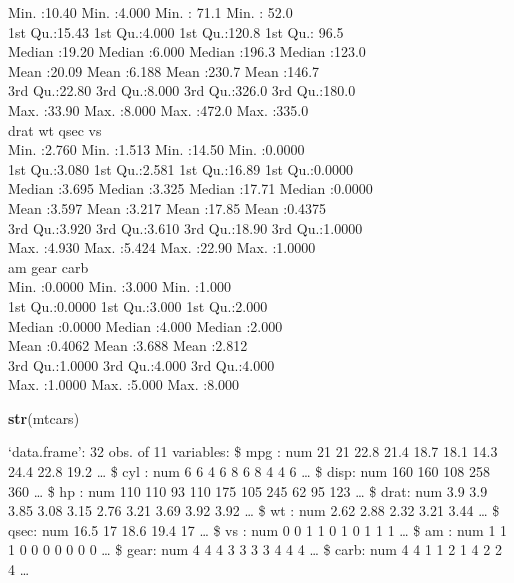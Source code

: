 \documentclass[12pt,]{04-class-files/abntex2}
\newenvironment{Shaded}{\begin{snugshade}}{\end{snugshade}}
\newcommand{\KeywordTok}[1]{\textcolor[rgb]{0.13,0.29,0.53}{\textbf{#1}}}
\newcommand{\NormalTok}[1]{#1}
\begin{document}
Min. :10.40 Min. :4.000 Min. : 71.1 Min. : 52.0\\
1st Qu.:15.43 1st Qu.:4.000 1st Qu.:120.8 1st Qu.: 96.5\\
Median :19.20 Median :6.000 Median :196.3 Median :123.0\\
Mean :20.09 Mean :6.188 Mean :230.7 Mean :146.7\\
3rd Qu.:22.80 3rd Qu.:8.000 3rd Qu.:326.0 3rd Qu.:180.0\\
Max. :33.90 Max. :8.000 Max. :472.0 Max. :335.0\\
drat wt qsec vs\\
Min. :2.760 Min. :1.513 Min. :14.50 Min. :0.0000\\
1st Qu.:3.080 1st Qu.:2.581 1st Qu.:16.89 1st Qu.:0.0000\\
Median :3.695 Median :3.325 Median :17.71 Median :0.0000\\
Mean :3.597 Mean :3.217 Mean :17.85 Mean :0.4375\\
3rd Qu.:3.920 3rd Qu.:3.610 3rd Qu.:18.90 3rd Qu.:1.0000\\
Max. :4.930 Max. :5.424 Max. :22.90 Max. :1.0000\\
am gear carb\\
Min. :0.0000 Min. :3.000 Min. :1.000\\
1st Qu.:0.0000 1st Qu.:3.000 1st Qu.:2.000\\
Median :0.0000 Median :4.000 Median :2.000\\
Mean :0.4062 Mean :3.688 Mean :2.812\\
3rd Qu.:1.0000 3rd Qu.:4.000 3rd Qu.:4.000\\
Max. :1.0000 Max. :5.000 Max. :8.000

\begin{Shaded}
\begin{Highlighting}[]
\KeywordTok{str}\NormalTok{(mtcars)}
\end{Highlighting}
\end{Shaded}

`data.frame': 32 obs. of 11 variables:
\$ mpg : num 21 21 22.8 21.4 18.7 18.1 14.3 24.4 22.8 19.2 \ldots{}
\$ cyl : num 6 6 4 6 8 6 8 4 4 6 \ldots{}
\$ disp: num 160 160 108 258 360 \ldots{}
\$ hp : num 110 110 93 110 175 105 245 62 95 123 \ldots{}
\$ drat: num 3.9 3.9 3.85 3.08 3.15 2.76 3.21 3.69 3.92 3.92 \ldots{}
\$ wt : num 2.62 2.88 2.32 3.21 3.44 \ldots{}
\$ qsec: num 16.5 17 18.6 19.4 17 \ldots{}
\$ vs : num 0 0 1 1 0 1 0 1 1 1 \ldots{}
\$ am : num 1 1 1 0 0 0 0 0 0 0 \ldots{}
\$ gear: num 4 4 4 3 3 3 3 4 4 4 \ldots{}
\$ carb: num 4 4 1 1 2 1 4 2 2 4 \ldots{}
\end{document}
